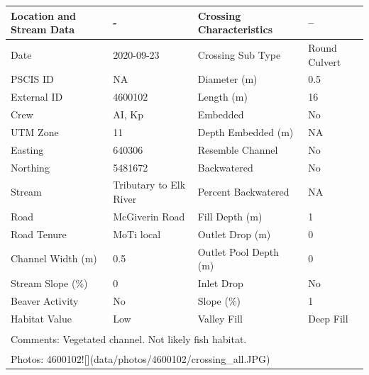\documentclass[
]{book}
\begin{document}
\begin{tabular}{l|l|l|l}
\hline
Location and Stream Data & - & Crossing Characteristics & --\\
\hline
Date & 2020-09-23 & Crossing Sub Type & Round Culvert\\
\hline
PSCIS ID & NA & Diameter (m) & 0.5\\
\hline
External ID & 4600102 & Length (m) & 16\\
\hline
Crew & AI, Kp & Embedded & No\\
\hline
UTM Zone & 11 & Depth Embedded (m) & NA\\
\hline
Easting & 640306 & Resemble Channel & No\\
\hline
Northing & 5481672 & Backwatered & No\\
\hline
Stream & Tributary to Elk River & Percent Backwatered & NA\\
\hline
Road & McGiverin Road & Fill Depth (m) & 1\\
\hline
Road Tenure & MoTi local & Outlet Drop (m) & 0\\
\hline
Channel Width (m) & 0.5 & Outlet Pool Depth (m) & 0\\
\hline
Stream Slope (\%) & 0 & Inlet Drop & No\\
\hline
Beaver Activity & No & Slope (\%) & 1\\
\hline
Habitat Value & Low & Valley Fill & Deep Fill\\
\hline
\multicolumn{4}{l}{\textsuperscript{} Comments: Vegetated channel. Not likely fish habitat.}\\
\multicolumn{4}{l}{\textsuperscript{} Photos: 4600102![](data/photos/4600102/crossing\_all.JPG)}\\
\end{tabular}
\end{document}
